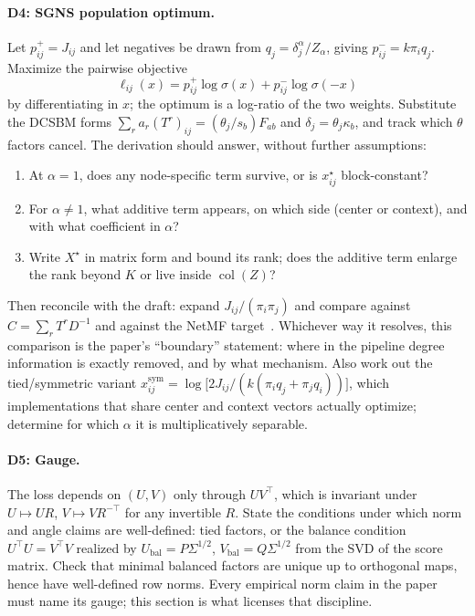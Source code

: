 \documentclass[11pt]{article}
\DeclareMathOperator{\col}{col}
\begin{document}
\paragraph{D4: SGNS population optimum.}
Let \(p^+_{ij}=J_{ij}\) and let negatives be drawn from \(q_j=\delta_j^\alpha/Z_\alpha\), giving \(p^-_{ij}=k\pi_i q_j\).
Maximize the pairwise objective
\begin{equation}
    \ell_{ij}(x)=p^+_{ij}\log\sigma(x)+p^-_{ij}\log\sigma(-x)
    \label{eq:pairwise-sgns}
\end{equation}
by differentiating in \(x\); the optimum is a log-ratio of the two weights.
Substitute the DCSBM forms \(\sum_r a_r(T^r)_{ij}=(\theta_j/s_b)F_{ab}\) and \(\delta_j=\theta_j\kappa_b\), and track which \(\theta\) factors cancel.
The derivation should answer, without further assumptions:
\begin{enumerate}
    \item At \(\alpha=1\), does any node-specific term survive, or is \(x^\star_{ij}\) block-constant?
    \item For \(\alpha\neq 1\), what additive term appears, on which side (center or context), and with what coefficient in \(\alpha\)?
    \item Write \(X^\star\) in matrix form and bound its rank; does the additive term enlarge the rank beyond \(K\) or live inside \(\col(Z)\)?
\end{enumerate}
Then reconcile with the draft: expand \(J_{ij}/(\pi_i\pi_j)\) and compare against \(C=\sum_r T^r D^{-1}\) and against the NetMF target~\citep{qiu2018network,levy2014neural}.
Whichever way it resolves, this comparison is the paper's ``boundary'' statement: where in the pipeline degree information is exactly removed, and by what mechanism.
Also work out the tied/symmetric variant \(x^{\mathrm{sym}}_{ij}=\log\bigl[2J_{ij}/(k(\pi_iq_j+\pi_jq_i))\bigr]\), which implementations that share center and context vectors actually optimize; determine for which \(\alpha\) it is multiplicatively separable.

\paragraph{D5: Gauge.}
The loss depends on \((U,V)\) only through \(UV^\top\), which is invariant under \(U\mapsto UR\), \(V\mapsto VR^{-\top}\) for any invertible \(R\).
State the conditions under which norm and angle claims are well-defined: tied factors, or the balance condition \(U^\top U=V^\top V\) realized by \(U_{\mathrm{bal}}=P\Sigma^{1/2}\), \(V_{\mathrm{bal}}=Q\Sigma^{1/2}\) from the SVD of the score matrix.
Check that minimal balanced factors are unique up to orthogonal maps, hence have well-defined row norms.
Every empirical norm claim in the paper must name its gauge; this section is what licenses that discipline.
\end{document}
